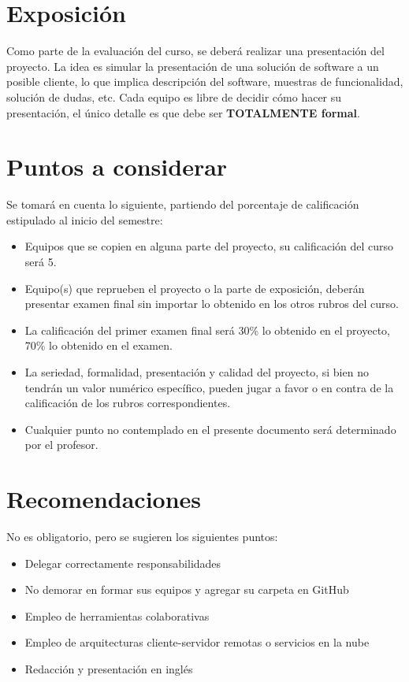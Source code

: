 \documentclass[10pt,openany]{book}
\begin{document}
\section{Exposición}
Como parte de la evaluación del curso, se deberá realizar una presentación del proyecto. La idea es simular la presentación de una solución de software a un posible cliente, lo que implica descripción del software, muestras de funcionalidad, solución de dudas, etc. Cada equipo es libre de decidir cómo hacer su presentación, el único detalle es que debe ser \textbf{TOTALMENTE formal}.

\section{Puntos a considerar}
Se tomará en cuenta lo siguiente, partiendo del porcentaje de calificación estipulado al inicio del semestre:
\begin{itemize}
    \item Equipos que se copien en alguna parte del proyecto, su calificación del curso será 5.
    \item Equipo(s) que reprueben el proyecto o la parte de exposición, deberán presentar examen final sin importar lo obtenido en los otros rubros del curso.
    \item La calificación del primer examen final será 30\% lo obtenido en el proyecto, 70\% lo obtenido en el examen.
    \item La seriedad, formalidad, presentación y calidad del proyecto, si bien no tendrán un valor numérico específico, pueden jugar a favor o en contra de la calificación de los rubros correspondientes.
    \item Cualquier punto no contemplado en el presente documento será determinado por el profesor.
\end{itemize}

\section{Recomendaciones}
No es obligatorio, pero se sugieren los siguientes puntos:
\begin{itemize}
    \item Delegar correctamente responsabilidades
    \item No demorar en formar sus equipos y agregar su carpeta en GitHub
    \item Empleo de herramientas colaborativas
    \item Empleo de arquitecturas cliente-servidor remotas o servicios en la nube
    \item Redacción y presentación en inglés
\end{itemize}
\end{document}
